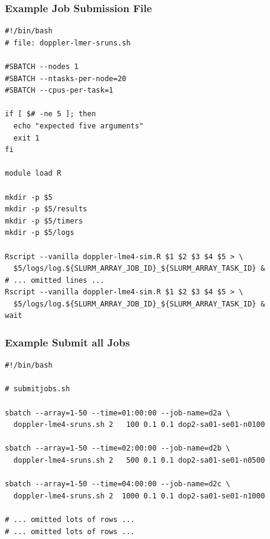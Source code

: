 \documentclass[10pt]{beamer}
\begin{document}
\begin{frame}[fragile]
  \frametitle{Example Job Submission File}
  \scriptsize
  \vspace{-0.2in}
\begin{verbatim}
#!/bin/bash
# file: doppler-lmer-sruns.sh

#SBATCH --nodes 1
#SBATCH --ntasks-per-node=20
#SBATCH --cpus-per-task=1 

if [ $# -ne 5 ]; then
  echo "expected five arguments"
  exit 1
fi

module load R

mkdir -p $5
mkdir -p $5/results
mkdir -p $5/timers
mkdir -p $5/logs

Rscript --vanilla doppler-lme4-sim.R $1 $2 $3 $4 $5 > \
  $5/logs/log.${SLURM_ARRAY_JOB_ID}_${SLURM_ARRAY_TASK_ID} &
# ... omitted lines ...
Rscript --vanilla doppler-lme4-sim.R $1 $2 $3 $4 $5 > \
  $5/logs/log.${SLURM_ARRAY_JOB_ID}_${SLURM_ARRAY_TASK_ID} &
wait
\end{verbatim}
\end{frame}

\begin{frame}[fragile]
  \frametitle{Example Submit all Jobs}
  \small
\begin{verbatim}
#!/bin/bash

# submitjobs.sh

sbatch --array=1-50 --time=01:00:00 --job-name=d2a \
  doppler-lme4-sruns.sh 2   100 0.1 0.1 dop2-sa01-se01-n0100

sbatch --array=1-50 --time=02:00:00 --job-name=d2b \
  doppler-lme4-sruns.sh 2   500 0.1 0.1 dop2-sa01-se01-n0500

sbatch --array=1-50 --time=04:00:00 --job-name=d2c \
  doppler-lme4-sruns.sh 2  1000 0.1 0.1 dop2-sa01-se01-n1000

# ... omitted lots of rows ...
# ... omitted lots of rows ...

\end{verbatim}
\end{frame}
\end{document}
